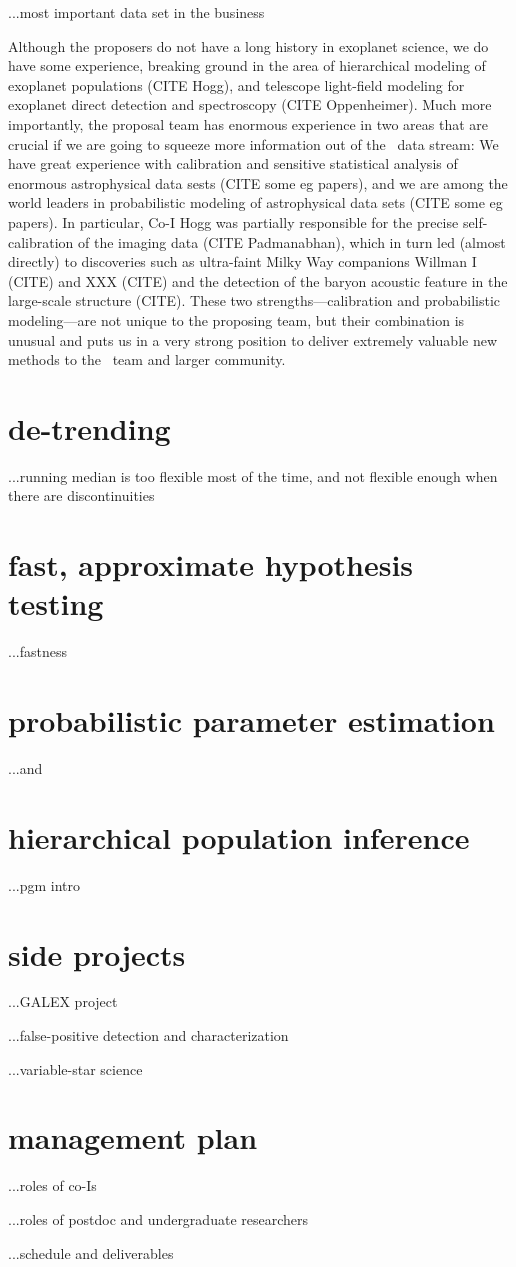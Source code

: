 \documentclass[letterpaper,12pt]{article}
\newcommand{\Bart}{\package{Bart}}
\newcommand{\emcee}{\package{emcee}}
\begin{document}
...most important data set in the business

Although the proposers do not have a long history in exoplanet
science, we do have some experience, breaking ground in the area of
hierarchical modeling of exoplanet populations (CITE Hogg), and
telescope light-field modeling for exoplanet direct detection and
spectroscopy (CITE Oppenheimer).  Much more importantly, the proposal
team has enormous experience in two areas that are crucial if we are
going to squeeze more information out of the \Kepler\ data stream: We
have great experience with calibration and sensitive statistical
analysis of enormous astrophysical data sests (CITE some eg papers),
and we are among the world leaders in probabilistic modeling of
astrophysical data sets (CITE some eg papers).  In particular, Co-I
Hogg was partially responsible for the precise self-calibration of the
 imaging data (CITE
Padmanabhan), which in turn led (almost directly) to discoveries such
as ultra-faint Milky Way companions Willman I (CITE) and XXX (CITE)
and the detection of the baryon acoustic feature in the large-scale
structure (CITE).  These two strengths---calibration and probabilistic
modeling---are not unique to the proposing team, but their
combination is unusual and puts us in a very strong position to
deliver extremely valuable new methods to the \Kepler\ team and larger
community.

\section{de-trending}

...running median is too flexible most of the time, and not flexible enough when there are discontinuities

\section{fast, approximate hypothesis testing}

...fastness

\section{probabilistic parameter estimation}

...\Bart and \emcee

\section{hierarchical population inference}

...pgm intro

\section{side projects}

...GALEX project

...false-positive detection and characterization

...variable-star science

\section{management plan}

...roles of co-Is

...roles of postdoc and undergraduate researchers

...schedule and deliverables
\end{document}
